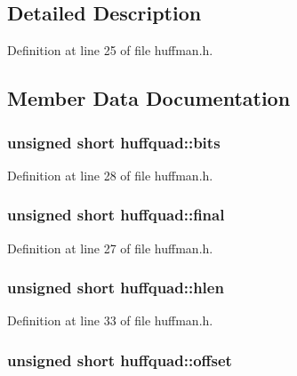 \subsection{Detailed Description}


Definition at line 25 of file huffman.\+h.



\subsection{Member Data Documentation}
\subsubsection[{\texorpdfstring{bits}{bits}}]{\setlength{\rightskip}{0pt plus 5cm}unsigned short huffquad\+::bits}\hypertarget{unionhuffquad_af07dd1c6263252b8d1120ff3af38112e}{}\label{unionhuffquad_af07dd1c6263252b8d1120ff3af38112e}


Definition at line 28 of file huffman.\+h.

\subsubsection[{\texorpdfstring{final}{final}}]{\setlength{\rightskip}{0pt plus 5cm}unsigned short huffquad\+::final}\hypertarget{unionhuffquad_a5bd7265016b81380790dc448a03d55f6}{}\label{unionhuffquad_a5bd7265016b81380790dc448a03d55f6}


Definition at line 27 of file huffman.\+h.

\subsubsection[{\texorpdfstring{hlen}{hlen}}]{\setlength{\rightskip}{0pt plus 5cm}unsigned short huffquad\+::hlen}\hypertarget{unionhuffquad_acd69822487b43dafe7145ba1d1877beb}{}\label{unionhuffquad_acd69822487b43dafe7145ba1d1877beb}


Definition at line 33 of file huffman.\+h.

\subsubsection[{\texorpdfstring{offset}{offset}}]{\setlength{\rightskip}{0pt plus 5cm}unsigned short huffquad\+::offset}\hypertarget{unionhuffquad_affd7aad1d4e86800b4289671b6d40c5c}{}\label{unionhuffquad_affd7aad1d4e86800b4289671b6d40c5c}


